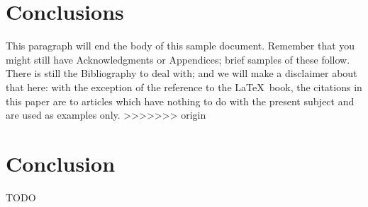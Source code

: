 \documentclass{acm_proc_article-sp}
\begin{document}
\section{Conclusions}
This paragraph will end the body of this sample document.
Remember that you might still have Acknowledgments or
Appendices; brief samples of these
follow.  There is still the Bibliography to deal with; and
we will make a disclaimer about that here: with the exception
of the reference to the \LaTeX\ book, the citations in
this paper are to articles which have nothing to
do with the present subject and are used as
examples only.
>>>>>>> origin

\section{Conclusion}
TODO
\end{document}
